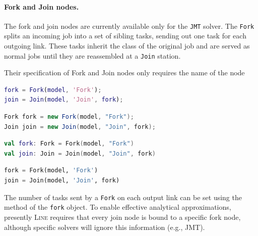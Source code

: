 \paragraph{Fork and Join nodes.} The fork and join nodes are currently available only for the \texttt{JMT} solver. The \texttt{Fork} splits an incoming job into a set of sibling tasks, sending out one task for each outgoing link. These tasks inherit the class of the original job and are served as normal jobs until they are reassembled at a \texttt{Join} station.

Their specification of Fork and Join nodes only requires the name of the node
\begin{MATLAB}
\begin{lstlisting}[language = matlab]
fork = Fork(model, 'Fork');
join = Join(model, 'Join', fork);
\end{lstlisting}
\end{MATLAB}
\begin{JAVA}
\begin{lstlisting}[language = java, basicstyle=\ttfamily\scriptsize]
Fork fork = new Fork(model, "Fork");
Join join = new Join(model, "Join", fork);
\end{lstlisting}
\end{JAVA}
\begin{KOTLIN}
\begin{lstlisting}[language = kotlin, basicstyle=\ttfamily\scriptsize]
val fork: Fork = Fork(model, "Fork")
val join: Join = Join(model, "Join", fork)
\end{lstlisting}
\end{KOTLIN}
\begin{PYTHON}
\begin{lstlisting}[language = python]
fork = Fork(model, 'Fork')
join = Join(model, 'Join', fork)
\end{lstlisting}
\end{PYTHON}

The number of tasks sent by a \texttt{Fork} on each output link can be set using the  method of the \texttt{fork} object. To enable effective analytical approximations, presently \textsc{Line} requires that every join node is bound to a specific fork node, although specific solvers will ignore this information (e.g., \textsc{JMT}).

